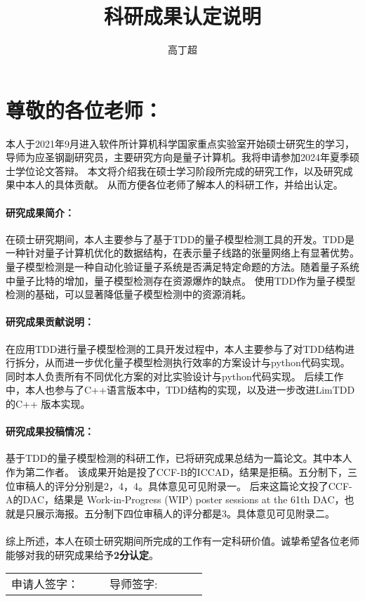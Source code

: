 \documentclass[10.5pt]{article} %
\title{科研成果认定说明} %
\author{高丁超} %
\date{} %
\begin{document}
\maketitle %
\thispagestyle{empty}
\section*{尊敬的各位老师：} %

本人于2021年9月进入软件所计算机科学国家重点实验室开始硕士研究生的学习，导师为应圣钢副研究员，主要研究方向是量子计算机。我将申请参加2024年夏季硕士学位论文答辩。
本文将介绍我在硕士学习阶段所完成的研究工作，以及研究成果中本人的具体贡献。
从而方便各位老师了解本人的科研工作，并给出认定。


\paragraph*{研究成果简介：} %
在硕士研究期间，本人主要参与了基于TDD的量子模型检测工具的开发。TDD是一种针对量子计算机优化的数据结构，在表示量子线路的张量网络上有显著优势。
量子模型检测是一种自动化验证量子系统是否满足特定命题的方法。随着量子系统中量子比特的增加，量子模型检测存在资源爆炸的缺点。
使用TDD作为量子模型检测的基础，可以显著降低量子模型检测中的资源消耗。

\paragraph*{研究成果贡献说明：}在应用TDD进行量子模型检测的工具开发过程中，本人主要参与了对TDD结构进行拆分，从而进一步优化量子模型检测执行效率的方案设计与python代码实现。
同时本人负责所有不同优化方案的对比实验设计与python代码实现。
后续工作中，本人也参与了C++语言版本中，TDD结构的实现，以及进一步改进LimTDD的C++ 版本实现。

\paragraph*{研究成果投稿情况：}
基于TDD的量子模型检测的科研工作，已将研究成果总结为一篇论文。其中本人作为第二作者。
该成果开始是投了CCF-B的ICCAD，结果是拒稿。五分制下，三位审稿人的评分分别是2，4，4。具体意见可见附录一。
后来这篇论文投了CCF-A的DAC，结果是 Work-in-Progress (WIP) poster sessions at the 61th DAC，也就是只展示海报。五分制下四位审稿人的评分都是3。具体意见可见附录二。

\paragraph*{}
\setlength{\parindent}{0pt}
综上所述，本人在硕士研究期间所完成的工作有一定科研价值。诚挚希望各位老师能够对我的研究成果给予\textbf{2分认定}。\\[0.5cm]
\begin{tabular}{p{0.4\linewidth} p{0.4\linewidth}}
    申请人签字： & \centering 导师签字: \\
\end{tabular}
\end{document}
